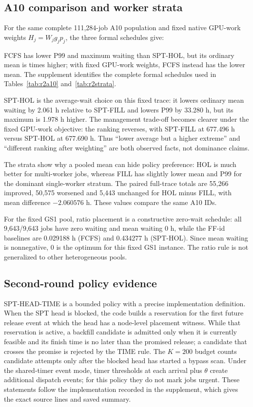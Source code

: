 \subsection{A10 comparison and worker strata}
For the same complete 111,284-job A10 population and fixed native GPU-work weights $H_j=W_jg_jp_j$, the three formal schedules give:


FCFS has lower P99 and maximum waiting than SPT-HOL, but its ordinary mean is \FCFSratio{} times higher; with fixed GPU-work weights, FCFS instead has the lower mean. The supplement identifies the complete formal schedules used in Tables~\ref{tab:r2a10} and~\ref{tab:r2strata}.

SPT-HOL is the average-wait choice on this fixed trace: it lowers ordinary mean waiting by 2.061 h relative to SPT-FILL and lowers P99 by 33.280 h, but its maximum is 1.978 h higher. The management trade-off becomes clearer under the fixed GPU-work objective: the ranking reverses, with SPT-FILL at 677.496 h versus SPT-HOL at 677.690 h. Thus ``lower average but a higher extreme'' and ``different ranking after weighting'' are both observed facts, not dominance claims.



The strata show why a pooled mean can hide policy preference: HOL is much better for multi-worker jobs, whereas FILL has slightly lower mean and P99 for the dominant single-worker stratum. The paired full-trace totals are 55,266 improved, 50,575 worsened and 5,443 unchanged for HOL minus FILL, with mean difference $-2.060576$ h. These values compare the same A10 IDs.

For the fixed GS1 pool, ratio placement is a constructive zero-wait schedule: all 9,643/9,643 jobs have zero waiting and mean waiting 0 h, while the FF-id baselines are 0.029188 h (FCFS) and 0.434277 h (SPT-HOL). Since mean waiting is nonnegative, 0 is the optimum for this fixed GS1 instance. The ratio rule is not generalized to other heterogeneous pools.

\subsection{Second-round policy evidence}
SPT-HEAD-TIME is a bounded policy with a precise implementation definition. When the SPT head is blocked, the code builds a reservation for the first future release event at which the head has a node-level placement witness. While that reservation is active, a backfill candidate is admitted only when it is currently feasible and its finish time is no later than the promised release; a candidate that crosses the promise is rejected by the TIME rule. The $K=200$ budget counts candidate attempts only after the blocked head has started a bypass scan. Under the shared-timer event mode, timer thresholds at each arrival plus $\theta$ create additional dispatch events; for this policy they do not mark jobs urgent. These statements follow the implementation recorded in the supplement, which gives the exact source lines and saved summary.

